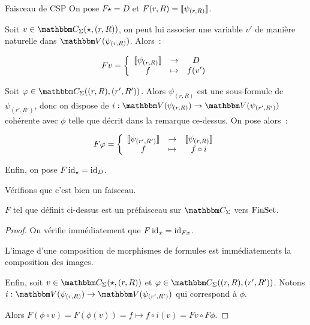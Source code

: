 \begin{defi}{Faisceau de CSP}
    On pose $F\star = D$ et $F(r,R) = \llbracket {\psi_{(r,R)}} \rrbracket$.

    Soit $v\in\C_\Sigma(\star, (r,R))$, on peut lui associer une variable $v'$ de manière
    naturelle dans $\V(\psi_{(r,R)})$. Alors~:
    
    \[ Fv = \left\{\begin{array}{ccc}
                       \llbracket {\psi_{(r,R)}} \rrbracket & \rightarrow & D     \\
                              f           & \mapsto     & f(v') \\
    \end{array}\right.\]

    Soit $\phi\in\C_\Sigma((r,R), (r',R'))$. Alors $\psi_{(r,R)}$ est une sous-formule
    de $\psi_{(r',R')}$, donc on dispose de
    $i : \V(\psi_{(r,R)})\rightarrow\V(\psi_{(r',R')})$ cohérente avec $\phi$ telle
    que décrit dans la remarque ce-dessus. On pose alors~:

    \[ F\varphi = \left\{\begin{array}{ccc}
                         \llbracket {\psi_{(r',R')}} \rrbracket & \rightarrow & \llbracket {\psi_{(r,R)}} \rrbracket \\
                                  f           & \mapsto     & f \circ i \\
    \end{array}\right.\]

    Enfin, on pose $F\operatorname{id}_\star = \operatorname{id}_D$.
\end{defi}

Vérifions que c'est bien un faisceau.

\begin{lem}
    $F$ tel que définit ci-dessus est un préfaisceau sur $\C_\Sigma$ vers $\text{FinSet}$.
\end{lem}

\begin{proof}
    On vérifie immédiatement que $F\operatorname{id}_x = \operatorname{id}_{Fx}$.

    L'image d'une composition de morphismes de formules est immédiatements la composition
    des images.

    Enfin, soit $v\in\C_\Sigma(\star, (r,R))$ et $\phi\in\C_\Sigma((r,R), (r',R'))$. Notons
    $i:\V(\psi_{(r,R)})\rightarrow\V(\psi_{(r',R')})$ qui correspond à $\phi$.

    Alors $F(\phi\circ v) = F(\phi(v)) = f\mapsto f\circ i(v) = Fv \circ F\phi$.
\end{proof}

